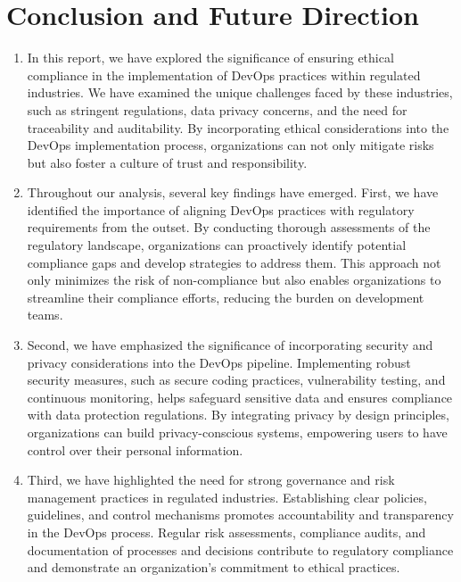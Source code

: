 \chapter*{Conclusion and Future Direction}

\begin{enumerate}

    \item In this report, we have explored the significance of ensuring ethical compliance in the implementation of DevOps practices within regulated industries. We have examined the unique challenges faced by these industries, such as stringent regulations, data privacy concerns, and the need for traceability and auditability. By incorporating ethical considerations into the DevOps implementation process, organizations can not only mitigate risks but also foster a culture of trust and responsibility.

    \item Throughout our analysis, several key findings have emerged. First, we have identified the importance of aligning DevOps practices with regulatory requirements from the outset. By conducting thorough assessments of the regulatory landscape, organizations can proactively identify potential compliance gaps and develop strategies to address them. This approach not only minimizes the risk of non-compliance but also enables organizations to streamline their compliance efforts, reducing the burden on development teams.

    \item Second, we have emphasized the significance of incorporating security and privacy considerations into the DevOps pipeline. Implementing robust security measures, such as secure coding practices, vulnerability testing, and continuous monitoring, helps safeguard sensitive data and ensures compliance with data protection regulations. By integrating privacy by design principles, organizations can build privacy-conscious systems, empowering users to have control over their personal information.

    \item Third, we have highlighted the need for strong governance and risk management practices in regulated industries. Establishing clear policies, guidelines, and control mechanisms promotes accountability and transparency in the DevOps process. Regular risk assessments, compliance audits, and documentation of processes and decisions contribute to regulatory compliance and demonstrate an organization's commitment to ethical practices.


\end{enumerate}
